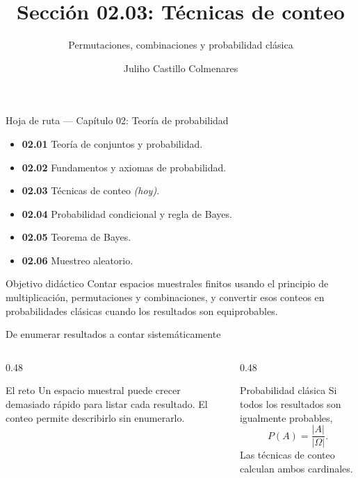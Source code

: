 \documentclass[10pt,aspectratio=169]{beamer}
\title[Técnicas de conteo]{Sección 02.03: Técnicas de conteo}
\subtitle{Permutaciones, combinaciones y probabilidad clásica}
\author[J. Castillo Colmenares]{Juliho Castillo Colmenares}
\institute{Tecnológico de Monterrey}
\date{\vspace{-1.2cm}}
\begin{document}
\begin{frame}[plain]
  \vspace{-0.8cm}
  \titlepage
\end{frame}

\begin{frame}{Hoja de ruta --- Capítulo 02: Teoría de probabilidad}
  \scriptsize
  \begin{itemize}\itemsep=0.04em
    \item \textbf{02.01} Teoría de conjuntos y probabilidad.
    \item \textbf{02.02} Fundamentos y axiomas de probabilidad.
    \item \textbf{02.03} Técnicas de conteo \emph{(hoy)}.
    \item \textbf{02.04} Probabilidad condicional y regla de Bayes.
    \item \textbf{02.05} Teorema de Bayes.
    \item \textbf{02.06} Muestreo aleatorio.
  \end{itemize}
  \vspace{-0.05cm}
  \begin{block}{Objetivo didáctico}
    Contar espacios muestrales finitos usando el principio de multiplicación,
    permutaciones y combinaciones, y convertir esos conteos en probabilidades
    clásicas cuando los resultados son equiprobables.
  \end{block}
\end{frame}

\begin{frame}{De enumerar resultados a contar sistemáticamente}
  \small
  \begin{columns}[T]
    \begin{column}{0.48\textwidth}
      \begin{block}{El reto}
        Un espacio muestral puede crecer demasiado rápido para listar cada
        resultado. El conteo permite describirlo sin enumerarlo.
      \end{block}
    \end{column}
    \begin{column}{0.48\textwidth}
      \begin{alertblock}{Probabilidad clásica}
        Si todos los resultados son igualmente probables,
        \[
          P(A)=\frac{\lvert A\rvert}{\lvert\Omega\rvert}.
        \]
        Las técnicas de conteo calculan ambos cardinales.
      \end{alertblock}
    \end{column}
  \end{columns}
\end{frame}
\end{document}
